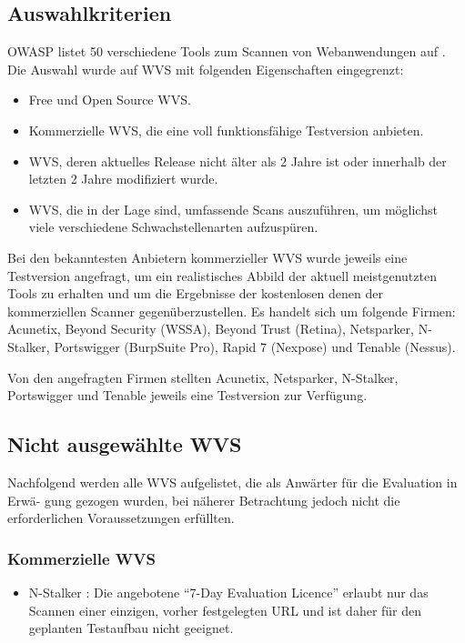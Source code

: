 \documentclass[12pt,oneside,a4paper,parskip,pointlessnumbers]{scrbook}
\begin{document}
  \subsection{Auswahlkriterien}
  OWASP listet 50 verschiedene Tools zum Scannen von Webanwendungen auf
  \cite{OWASPtools}. Die Auswahl wurde auf WVS mit folgenden Eigenschaften eingegrenzt:
  \begin{itemize}
    \item Free und Open Source WVS.
    \item Kommerzielle WVS, die eine voll funktionsfähige Testversion anbieten.
    \item WVS, deren aktuelles Release nicht älter als 2 Jahre ist oder innerhalb der letzten 2 Jahre modifiziert wurde.
    \item WVS, die in der Lage sind, umfassende Scans auszuführen, um möglichst viele verschiedene Schwachstellenarten aufzuspüren.
  \end{itemize}
  Bei den bekanntesten Anbietern kommerzieller WVS wurde jeweils eine Testversion angefragt, um ein realistisches Abbild der aktuell meistgenutzten Tools zu erhalten und um die Ergebnisse der kostenlosen denen der kommerziellen Scanner gegenüberzustellen. Es handelt sich um folgende Firmen:
  \\Acunetix, Beyond Security (WSSA), Beyond Trust (Retina), Netsparker, N-Stalker, Portswigger (BurpSuite Pro), Rapid 7 (Nexpose) und Tenable (Nessus).

  Von den angefragten Firmen stellten Acunetix, Netsparker, N-Stalker, Portswigger und Tenable jeweils eine Testversion zur Verfügung.

  \subsection{Nicht ausgewählte WVS}
    Nachfolgend werden alle WVS aufgelistet, die als Anwärter für die Evaluation in Erwä- gung gezogen wurden, bei näherer Betrachtung jedoch nicht die erforderlichen Voraussetzungen erfüllten.
    \subsubsection{Kommerzielle WVS}
      \begin{itemize}
        \item N-Stalker \cite{Stalker}: Die angebotene ``7-Day Evaluation Licence'' erlaubt nur das Scannen einer einzigen, vorher festgelegten URL und ist daher für den geplanten Testaufbau nicht geeignet.
      \end{itemize}
\end{document}
